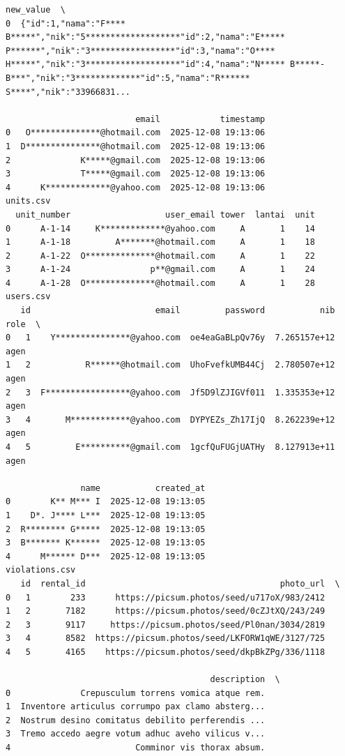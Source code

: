 \begin{lstlisting}[caption={Output 12}]
                                           new_value  \
0  {"id":1,"nama":"F**** B*****","nik":"5*******************"id":2,"nama":"E***** P******","nik":"3*****************"id":3,"nama":"O**** H*****","nik":"3*******************"id":4,"nama":"N***** B*****-B***","nik":"3*************"id":5,"nama":"R****** S****","nik":"33966831...   

                          email            timestamp  
0   O**************@hotmail.com  2025-12-08 19:13:06  
1  D***************@hotmail.com  2025-12-08 19:13:06  
2              K*****@gmail.com  2025-12-08 19:13:06  
3              T*****@gmail.com  2025-12-08 19:13:06  
4      K*************@yahoo.com  2025-12-08 19:13:06  
units.csv
  unit_number                   user_email tower  lantai  unit
0      A-1-14     K*************@yahoo.com     A       1    14
1      A-1-18         A*******@hotmail.com     A       1    18
2      A-1-22  O**************@hotmail.com     A       1    22
3      A-1-24                p**@gmail.com     A       1    24
4      A-1-28  O**************@hotmail.com     A       1    28
users.csv
   id                         email         password           nib  role  \
0   1    Y***************@yahoo.com  oe4eaGaBLpQv76y  7.265157e+12  agen   
1   2           R******@hotmail.com  UhoFvefkUMB44Cj  2.780507e+12  agen   
2   3  F*****************@yahoo.com  Jf5D9lZJIGVf011  1.335353e+12  agen   
3   4       M************@yahoo.com  DYPYEZs_Zh17IjQ  8.262239e+12  agen   
4   5         E**********@gmail.com  1gcfQuFUGjUATHy  8.127913e+11  agen   

               name           created_at  
0        K** M*** I  2025-12-08 19:13:05  
1    D*. J**** L***  2025-12-08 19:13:05  
2  R******** G*****  2025-12-08 19:13:05  
3  B******* K******  2025-12-08 19:13:05  
4      M****** D***  2025-12-08 19:13:05  
violations.csv
   id  rental_id                                       photo_url  \
0   1        233      https://picsum.photos/seed/u717oX/983/2412   
1   2       7182      https://picsum.photos/seed/0cZJtXQ/243/249   
2   3       9117     https://picsum.photos/seed/Pl0nan/3034/2819   
3   4       8582  https://picsum.photos/seed/LKFORW1qWE/3127/725   
4   5       4165    https://picsum.photos/seed/dkpBkZPg/336/1118   

                                         description  \
0              Crepusculum torrens vomica atque rem.   
1  Inventore articulus corrumpo pax clamo absterg...   
2  Nostrum desino comitatus debilito perferendis ...   
3  Tremo accedo aegre votum adhuc aveho vilicus v...   
4                         Comminor vis thorax absum.   


\end{lstlisting}
